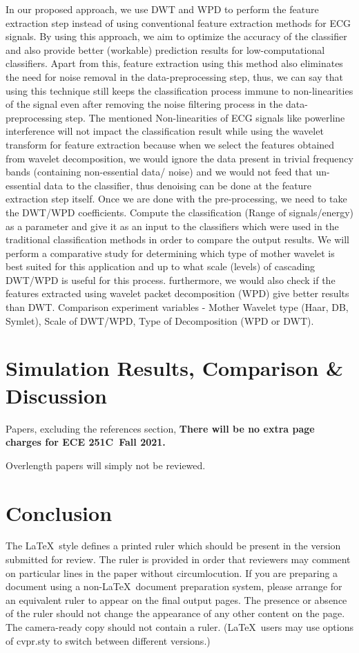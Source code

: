 \documentclass[10pt,twocolumn,letterpaper]{article}
\def\confName{ECE 251C}
\def\confYear{Fall 2021}
\begin{document}
In our proposed approach, we use DWT and WPD to perform the feature extraction step instead of using conventional feature extraction methods for ECG signals. By using this approach, we aim to optimize the accuracy of the classifier and also provide better (workable) prediction results for low-computational classifiers. Apart from this, feature extraction using this method also eliminates the need for noise removal in the data-preprocessing step, thus, we can say that using this technique still keeps the classification process immune to non-linearities of the signal even after removing the noise filtering process in the data-preprocessing step.
The mentioned Non-linearities of ECG signals like powerline interference will not impact the classification result while using the wavelet transform for feature extraction because when we select the features obtained from wavelet decomposition, we would ignore the data present in trivial frequency bands (containing non-essential data/ noise) and we would not feed that un-essential data to the classifier, thus denoising can be done at the feature extraction step itself. 
Once we are done with the pre-processing, we need to take the DWT/WPD coefficients. Compute the classification (Range of signals/energy) as a parameter and give it as an input to the classifiers which were used in the traditional classification methods in order to compare the output results.
We will perform a comparative study for determining which type of mother wavelet is best suited for this application and up to what scale (levels) of cascading DWT/WPD is useful for this process. furthermore, we would also check if the features extracted using wavelet packet decomposition (WPD) give better results than DWT.
Comparison experiment variables - Mother Wavelet type (Haar, DB, Symlet), Scale of DWT/WPD, Type of Decomposition (WPD or DWT).


\section{Simulation Results, Comparison & Discussion}
Papers, excluding the references section, 
{\bf There will be no extra page charges for \confName\ \confYear.}

Overlength papers will simply not be reviewed.


\section{Conclusion}
The \LaTeX\ style defines a printed ruler which should be present in the version submitted for review.
The ruler is provided in order that reviewers may comment on particular lines in the paper without circumlocution.
If you are preparing a document using a non-\LaTeX\ document preparation system, please arrange for an equivalent ruler to appear on the final output pages.
The presence or absence of the ruler should not change the appearance of any other content on the page.
The camera-ready copy should not contain a ruler.
(\LaTeX\ users may use options of cvpr.sty to switch between different versions.)
\end{document}
